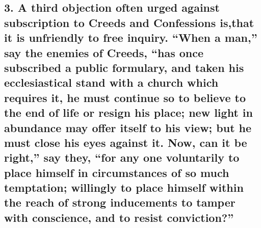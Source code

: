 \documentclass[
]{book}
\begin{document}
\hypertarget{a-third-objection-often-urged-against-subscription-to-creeds-and-confessions-isthat-it-is-unfriendly-to-free-inquiry.-when-a-man-say-the-enemies-of-creeds-has-once-subscribed-a-public-formulary-and-taken-his-ecclesiastical-stand-with-a-church-which-requires-it-he-must-continue-so-to-believe-to-the-end-of-life-or-resign-his-place-new-light-in-abundance-may-offer-itself-to-his-view-but-he-must-close-his-eyes-against-it.-now-can-it-be-right-say-they-for-any-one-voluntarily-to-place-himself-in-circumstances-of-so-much-temptation-willingly-to-place-himself-within-the-reach-of-strong-inducements-to-tamper-with-conscience-and-to-resist-conviction}{%
\subsection{3. A third objection often urged against subscription to Creeds and Confessions is,that it is unfriendly to free inquiry. ``When a man,'' say the enemies of Creeds, ``has once subscribed a public formulary, and taken his ecclesiastical stand with a church which requires it, he must continue so to believe to the end of life or resign his place; new light in abundance may offer itself to his view; but he must close his eyes against it. Now, can it be right,'' say they, ``for any one voluntarily to place himself in circumstances of so much temptation; willingly to place himself within the reach of strong inducements to tamper with conscience, and to resist conviction?''}\label{a-third-objection-often-urged-against-subscription-to-creeds-and-confessions-isthat-it-is-unfriendly-to-free-inquiry.-when-a-man-say-the-enemies-of-creeds-has-once-subscribed-a-public-formulary-and-taken-his-ecclesiastical-stand-with-a-church-which-requires-it-he-must-continue-so-to-believe-to-the-end-of-life-or-resign-his-place-new-light-in-abundance-may-offer-itself-to-his-view-but-he-must-close-his-eyes-against-it.-now-can-it-be-right-say-they-for-any-one-voluntarily-to-place-himself-in-circumstances-of-so-much-temptation-willingly-to-place-himself-within-the-reach-of-strong-inducements-to-tamper-with-conscience-and-to-resist-conviction}}
\end{document}
